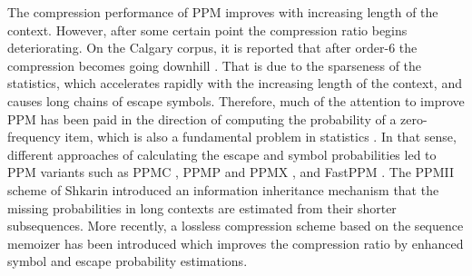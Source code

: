\documentclass[runningheads,a4paper]{llncs}
\begin{document}
The compression performance of PPM improves with increasing length of the context. 
However, after some certain point the compression ratio begins deteriorating. 
On the Calgary corpus, it is reported that after order-$6$ the compression becomes going downhill \cite{Sal04}. 
That is due to the sparseness of the statistics, which accelerates rapidly with the increasing length of the context, 
 and causes long chains of escape symbols. 
Therefore, much of the attention to improve PPM has been paid in the direction of computing the probability of a 
zero-frequency item, which is also a fundamental problem in statistics \cite{WB91,CT95,wood2011}. 
In that sense, different approaches of calculating the escape and symbol probabilities led to PPM variants such as PPMC
\cite{Moffat90}, PPMP and PPMX \cite{WB91}, and FastPPM \cite{HV94}. The PPMII \cite{shkarin2001,shkarin2002ppm} scheme
of Shkarin introduced an information inheritance mechanism  that the missing probabilities in long contexts are 
estimated from their shorter subsequences. 
More recently,  a lossless compression scheme based on the sequence memoizer \cite{gasthaus2010} has been introduced
which improves the compression ratio by enhanced symbol and escape probability estimations.
\end{document}
